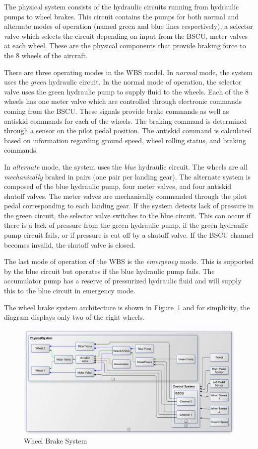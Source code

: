 The physical system consists of the hydraulic circuits running from hydraulic pumps to wheel brakes. This circuit contains the pumps for both normal and alternate modes of operation (named green and blue lines respectively), a selector valve which selects the circuit depending on input from the BSCU, meter valves at each wheel. These are the physical components that provide braking force to the 8 wheels of the aircraft.

There are three operating modes in the WBS model. In \textit{normal} mode, the system uses the \textit{green} hydraulic circuit. In the normal mode of operation, the selector valve uses the green hydraulic pump to supply fluid to the wheels. Each of the 8 wheels has one meter valve which  are controlled through electronic commands coming from the BSCU. These signals provide brake commands as well as antiskid commands for each of the wheels. The braking command is determined through a sensor on the pilot pedal position. The antiskid command is calculated based on information regarding ground speed, wheel rolling status, and braking commands.

In \textit{alternate} mode, the system uses the \textit{blue} hydraulic circuit.  The wheels are all \textit{mechanically} braked in pairs (one pair per landing gear). The alternate system is composed of the blue hydraulic pump, four meter valves, and four antiskid shutoff valves. The meter valves are mechanically commanded through the pilot pedal corresponding to each landing gear. If the system detects lack of pressure in the green circuit, the selector valve switches to the blue circuit. This can occur if there is a lack of pressure from the green hydraulic pump, if the green hydraulic pump circuit fails, or if pressure is cut off by a shutoff valve. If the BSCU channel becomes invalid, the shutoff valve is closed.

The last mode of operation of the WBS is the \textit{emergency} mode. This is supported by the blue circuit but operates if the blue hydraulic pump fails. The accumulator pump has a reserve of pressurized hydraulic fluid and will supply this to the blue circuit in emergency mode.

The wheel brake system architecture is shown in Figure~\ref{fig:wbs} and for simplicity, the diagram displays only two of the eight wheels. 

\begin{figure}[h!]
	\centering
	\includegraphics[trim=0 9 0 5,clip,width=\textwidth]{images/wbs_arch4_diagram.pdf}
	\caption{Wheel Brake System}
	\label{fig:wbs}
\end{figure} 

